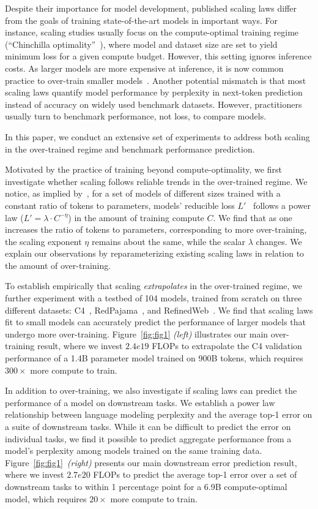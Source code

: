 Despite their importance for model development, published scaling laws differ from the goals of training state-of-the-art models in important ways.
For instance, scaling studies usually focus on the compute-optimal training regime (``Chinchilla optimality''~\cite{chinchilla}), where model and dataset size are set to yield minimum loss for a given compute budget. However, this setting ignores inference costs. As larger models are more expensive at inference, it is now common practice to over-train smaller models~\cite{llama}. Another potential mismatch is that most scaling laws quantify model performance by perplexity in next-token prediction instead of accuracy on widely used benchmark datasets. However, practitioners usually turn to benchmark performance, not loss, to compare models.

In this paper, we conduct an extensive set of experiments to address both scaling in the over-trained regime and benchmark performance prediction.

Motivated by the practice of training beyond compute-optimality, we first investigate whether scaling follows reliable trends in the over-trained regime.
We notice, as implied by~\citet{chinchilla}, for a set of models of different sizes trained with a constant ratio of tokens to parameters, models' reducible loss $L'$~\cite{og_scaling,chinchilla} follows a power law ($L' = \lambda \cdot C^{-\eta}$) in the amount of training compute $C$.
We find that as one increases the ratio of tokens to parameters, corresponding to more over-training, the scaling exponent $\eta$ remains about the same, while the scalar $\lambda$ changes. We explain our observations by reparameterizing existing scaling laws in relation to the amount of over-training.

To establish empirically that scaling \emph{extrapolates} in the over-trained regime, we further experiment with a testbed of 104 models, trained from scratch on three different datasets: C4~\cite{c4,c4_ai2}, RedPajama~\cite{rpj}, and RefinedWeb~\cite{refinedweb}. 
We find that scaling laws fit to small models can accurately predict the performance of larger models that undergo more over-training.
Figure~\ref{fig:fig1} \emph{(left)} illustrates our main over-training result, where we invest $2.4e19$ FLOPs to extrapolate the C4 validation performance of a 1.4B parameter model trained on 900B tokens, which requires $300\times$ more compute to train.

In addition to over-training, we also investigate if scaling laws can predict the performance of a model on downstream tasks.
We establish a power law relationship between language modeling perplexity and the average top-1 error on a suite of downstream tasks.
While it can be difficult to predict the error on individual tasks, we find it possible to predict aggregate performance from a model's perplexity among models trained on the same training data.
Figure~\ref{fig:fig1}~\emph{(right)} presents our main downstream error prediction result, where we invest $2.7e20$ FLOPs to predict the average top-1 error over a set of downstream tasks to within 1 percentage point for a 6.9B compute-optimal model, which requires $20\times$ more compute to train.

